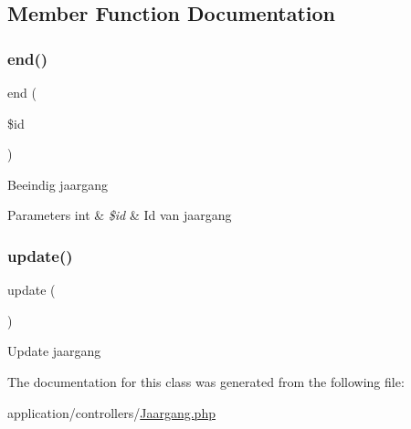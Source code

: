 \subsection{Member Function Documentation}
\mbox{\label{class_jaargang_a96b12cad9ede16ef3e87c74cf77b894b}} 
\subsubsection{\texorpdfstring{end()}{end()}}
{\footnotesize\ttfamily end (\begin{DoxyParamCaption}\item[{}]{\$id }\end{DoxyParamCaption})}

Beeindig jaargang 
\begin{DoxyParams}[1]{Parameters}
int & {\em \$id} & Id van jaargang \\
\hline
\end{DoxyParams}
\mbox{\label{class_jaargang_a842e4774e3b3601a005b995c02f7e883}} 
\subsubsection{\texorpdfstring{update()}{update()}}
{\footnotesize\ttfamily update (\begin{DoxyParamCaption}{ }\end{DoxyParamCaption})}

Update jaargang 

The documentation for this class was generated from the following file\+:\begin{DoxyCompactItemize}
\item 
application/controllers/\mbox{\hyperlink{_jaargang_8php}{Jaargang.\+php}}\end{DoxyCompactItemize}
